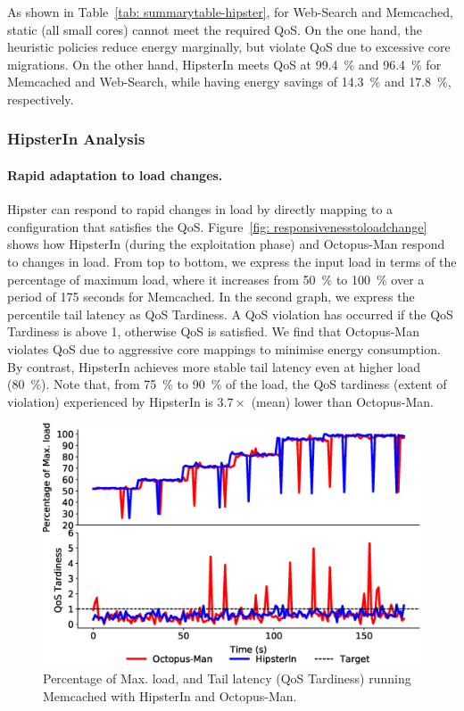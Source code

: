 As shown in Table~\ref{tab: summarytable-hipster}, for Web-Search and Memcached, static
(all small cores) cannot meet the required QoS. On the one hand, the heuristic policies
reduce energy marginally, but violate QoS due to excessive core migrations. On the other
hand, HipsterIn meets QoS at \SI{99.4}{\percent} and \SI{96.4}{\percent} for Memcached and
Web-Search, while having energy savings of \SI{14.3}{\percent} and \SI{17.8}{\percent},
respectively.



\subsubsection{HipsterIn Analysis}




\paragraph*{Rapid adaptation to load changes.} Hipster can respond to rapid changes in
load by directly mapping to a configuration that satisfies the QoS.  Figure~\ref{fig:
responsivenesstoloadchange} shows how HipsterIn (during the exploitation phase) and
Octo\-pus-Man respond to changes in load. From top to bottom, we express the input load in
terms of the percentage of maximum load, where it increases from \SI{50}{\percent} to
\SI{100}{\percent} over a period of 175 seconds for Memcached. In the second graph, we
express the \ninefive percentile tail latency as QoS Tardiness. A QoS violation has
occurred if the QoS Tardiness is above 1, otherwise QoS is satisfied.  We find that
Octopus-Man violates QoS due to aggressive core mappings to minimise energy consumption.
By contrast, HipsterIn achieves more stable tail latency even at higher load
(\SI{80}{\percent}). Note that, from \SI{75}{\percent} to \SI{90}{\percent} of the load,
the QoS tardiness (extent of violation) experienced by HipsterIn is $3.7\times$ (mean)
lower than Octopus-Man. 

\begin{figure}[t]
	\centering
	\includegraphics[width=0.7\linewidth]{Chapter4/Figs/detail_responsiveness.eps}
    \caption[Responsiveness to load change of HipsterIn and Octopus-Man]{ Percentage of Max. load, and Tail latency (QoS Tardiness) running Memcached with HipsterIn and Octopus-Man.}
	\label{fig: responsivenesstoloadchange}
\end{figure}



